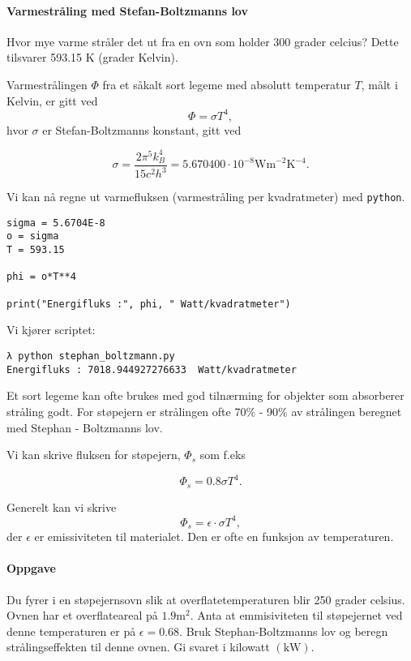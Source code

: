 \documentclass[]{article}
\let\oldparagraph\paragraph
\renewcommand{\paragraph}[1]{\oldparagraph{#1}\mbox{}}
\begin{document}
\paragraph{Varmestråling med Stefan-Boltzmanns
lov}\label{varmestruxe5ling-med-stefan-boltzmanns-lov}

Hvor mye varme stråler det ut fra en ovn som holder 300 grader celcius?
Dette tilsvarer 593.15 K (grader Kelvin).

Varmestrålingen \(\Phi\) fra et såkalt sort legeme med absolutt
temperatur \(T\), målt i Kelvin, er gitt ved \[ \Phi = \sigma T^4,\]
hvor \(\sigma\) er Stefan-Boltzmanns konstant, gitt ved

\[\sigma = \frac{2\pi^5k_B^4}{15c^2h^3} = 5.670400\cdot 10^{-8} \text{Wm}^{-2}\text{K}^{-4}.\]

Vi kan nå regne ut varmefluksen (varmestråling per kvadratmeter) med
\texttt{python}.

\begin{verbatim}
sigma = 5.6704E-8
o = sigma
T = 593.15

phi = o*T**4

print("Energifluks :", phi, " Watt/kvadratmeter")
\end{verbatim}

Vi kjører scriptet:

\begin{verbatim}
λ python stephan_boltzmann.py
Energifluks : 7018.944927276633  Watt/kvadratmeter
\end{verbatim}

Et sort legeme kan ofte brukes med god tilnærming for objekter som
absorberer stråling godt. For støpejern er strålingen ofte 70\% - 90\%
av strålingen beregnet med Stephan - Boltzmanns lov.

Vi kan skrive fluksen for støpejern, \(\Phi_{s}\) som f.eks

\[ \Phi_{s} = 0.8\sigma T^4.\]

Generelt kan vi skrive \[ \Phi_{s} = \epsilon\cdot\sigma T^4,\] der
\(\epsilon\) er emissiviteten til materialet. Den er ofte en funksjon av
temperaturen.

\paragraph{Oppgave}\label{oppgave}

Du fyrer i en støpejernsovn slik at overflatetemperaturen blir 250
grader celsius. Ovnen har et overflateareal på \(1.9\text{m}^2\). Anta
at emmisiviteten til støpejernet ved denne temperaturen er på
\(\epsilon = 0.68\). Bruk Stephan-Boltzmanns lov og beregn
strålingseffekten til denne ovnen. Gi svaret i kilowatt \((\text{kW})\).
\end{document}
